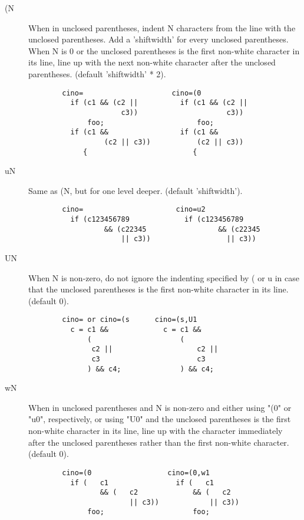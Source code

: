 \begin{description}
    \item[(N]    When in unclosed parentheses, indent N characters from the line
          with the unclosed parentheses.  Add a 'shiftwidth' for every
          unclosed parentheses.  When N is 0 or the unclosed parentheses
          is the first non-white character in its line, line up with the
          next non-white character after the unclosed parentheses.
          (default 'shiftwidth' * 2).
\begin{verbatim}
        cino=                     cino=(0
          if (c1 && (c2 ||          if (c1 && (c2 ||
                      c3))                     c3))
              foo;                      foo;
          if (c1 &&                 if (c1 &&
                  (c2 || c3))           (c2 || c3))
             {                         {
 \end{verbatim}
    \item[uN] Same as (N, but for one level deeper.  (default 'shiftwidth').
\begin{verbatim}
        cino=                      cino=u2
          if (c123456789             if (c123456789
                  && (c22345                 && (c22345
                      || c3))                  || c3))
 \end{verbatim}
    \item[UN] When N is non-zero, do not ignore the indenting specified by
          ( or u in case that the unclosed parentheses is the first
          non-white character in its line.  (default 0).
\begin{verbatim}
        cino= or cino=(s      cino=(s,U1
          c = c1 &&             c = c1 &&
              (                     (
               c2 ||                    c2 ||
               c3                       c3
              ) && c4;              ) && c4;
 \end{verbatim}
  \clearpage
    \item[wN] When in unclosed parentheses and N is non-zero and either
          using "(0" or "u0", respectively, or using "U0" and the unclosed
          parentheses is the first non-white character in its line, line
          up with the character immediately after the unclosed parentheses
          rather than the first non-white character.  (default 0).
\begin{verbatim}
        cino=(0                  cino=(0,w1
          if (   c1                if (   c1
                 && (   c2             && (   c2
                        || c3))            || c3))
              foo;                     foo;

\end{verbatim}
\end{description}
